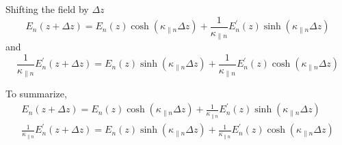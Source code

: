 Shifting the field by $\Delta z$
\begin{equation}
E_n(z+\Delta z) = E_n(z) \cosh(\kappa_{\parallel n}\Delta z) + \frac{1}{\kappa_{\parallel n}} E_n^{\prime}(z) \sinh(\kappa_{\parallel n}\Delta z)
\end{equation}
and
\begin{equation}
\frac{1}{\kappa_{\parallel n}}E_n^{\prime}(z+\Delta z) =E_n(z) \sinh(\kappa_{\parallel n}\Delta z) + \frac{1}{\kappa_{\parallel n}} E_n^{\prime}(z) \cosh(\kappa_{\parallel n}\Delta z)
\end{equation}

To summarize,
\begin{equation}
\begin{gathered}
E_n(z+\Delta z) = E_n(z) \cosh(\kappa_{\parallel n}\Delta z) + \frac{1}{\kappa_{\parallel n}} E_n^{\prime}(z) \sinh(\kappa_{\parallel n}\Delta z) \\
\frac{1}{\kappa_{\parallel n}}E_n^{\prime}(z+\Delta z) =E_n(z) \sinh(\kappa_{\parallel n}\Delta z) + \frac{1}{\kappa_{\parallel n}} E_n^{\prime}(z) \cosh(\kappa_{\parallel n}\Delta z)
\label{eq:closed_channel_transfer}
\end{gathered}
\end{equation}

